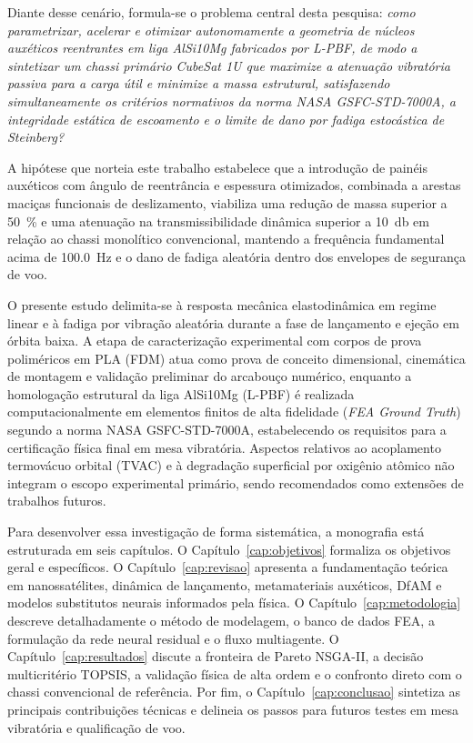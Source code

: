 Diante desse cenário, formula-se o problema central desta pesquisa: \textit{como parametrizar, acelerar e otimizar autonomamente a geometria de núcleos auxéticos reentrantes em liga AlSi10Mg fabricados por L-PBF, de modo a sintetizar um chassi primário CubeSat 1U que maximize a atenuação vibratória passiva para a carga útil e minimize a massa estrutural, satisfazendo simultaneamente os critérios normativos da norma NASA GSFC-STD-7000A, a integridade estática de escoamento e o limite de dano por fadiga estocástica de Steinberg?}

A hipótese que norteia este trabalho estabelece que a introdução de painéis auxéticos com ângulo de reentrância e espessura otimizados, combinada a arestas maciças funcionais de deslizamento, viabiliza uma redução de massa superior a \SI{50}{\percent} e uma atenuação na transmissibilidade dinâmica superior a \SI{10}{\decibel} em relação ao chassi monolítico convencional, mantendo a frequência fundamental acima de \SI{100.0}{\hertz} e o dano de fadiga aleatória dentro dos envelopes de segurança de voo.

O presente estudo delimita-se à resposta mecânica elastodinâmica em regime linear e à fadiga por vibração aleatória durante a fase de lançamento e ejeção em órbita baixa. A etapa de caracterização experimental com corpos de prova poliméricos em PLA (FDM) atua como prova de conceito dimensional, cinemática de montagem e validação preliminar do arcabouço numérico, enquanto a homologação estrutural da liga AlSi10Mg (L-PBF) é realizada computacionalmente em elementos finitos de alta fidelidade (\textit{FEA Ground Truth}) segundo a norma NASA GSFC-STD-7000A, estabelecendo os requisitos para a certificação física final em mesa vibratória. Aspectos relativos ao acoplamento termovácuo orbital (TVAC) e à degradação superficial por oxigênio atômico não integram o escopo experimental primário, sendo recomendados como extensões de trabalhos futuros.

Para desenvolver essa investigação de forma sistemática, a monografia está estruturada em seis capítulos. O Capítulo~\ref{cap:objetivos} formaliza os objetivos geral e específicos. O Capítulo~\ref{cap:revisao} apresenta a fundamentação teórica em nanossatélites, dinâmica de lançamento, metamateriais auxéticos, DfAM e modelos substitutos neurais informados pela física. O Capítulo~\ref{cap:metodologia} descreve detalhadamente o método de modelagem, o banco de dados FEA, a formulação da rede neural residual e o fluxo multiagente. O Capítulo~\ref{cap:resultados} discute a fronteira de Pareto NSGA-II, a decisão multicritério TOPSIS, a validação física de alta ordem e o confronto direto com o chassi convencional de referência. Por fim, o Capítulo~\ref{cap:conclusao} sintetiza as principais contribuições técnicas e delineia os passos para futuros testes em mesa vibratória e qualificação de voo.
